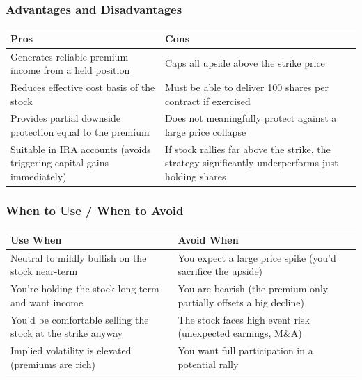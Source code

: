 \documentclass[12pt,openany]{book}
\begin{document}
\subsubsection{Advantages and Disadvantages}

\begin{center}
\scriptsize
\setlength{\tabcolsep}{3pt}
\begin{tabular}{|L{6.00cm}|L{6.00cm}|}
\hline
Pros & Cons \\
\hline
Generates reliable premium income from a held position & Caps all upside above the strike price \\
\hline
Reduces effective cost basis of the stock & Must be able to deliver 100 shares per contract if exercised \\
\hline
Provides partial downside protection equal to the premium & Does not meaningfully protect against a large price collapse \\
\hline
Suitable in IRA accounts (avoids triggering capital gains immediately) & If stock rallies far above the strike, the strategy significantly underperforms just holding shares \\
\hline
\end{tabular}
\end{center}



\subsubsection{When to Use / When to Avoid}

\begin{center}
\scriptsize
\setlength{\tabcolsep}{3pt}
\begin{tabular}{|L{6.00cm}|L{6.00cm}|}
\hline
Use When & Avoid When \\
\hline
Neutral to mildly bullish on the stock near-term & You expect a large price spike (you'd sacrifice the upside) \\
\hline
You're holding the stock long-term and want income & You are bearish (the premium only partially offsets a big decline) \\
\hline
You'd be comfortable selling the stock at the strike anyway & The stock faces high event risk (unexpected earnings, M\&A) \\
\hline
Implied volatility is elevated (premiums are rich) & You want full participation in a potential rally \\
\hline
\end{tabular}
\end{center}
\end{document}

